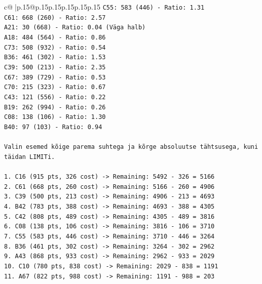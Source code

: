 \documentclass{article}
\begin{document}
{\begin{supertabular}{c@{$\;$}|p{.15\linewidth}@{}p{.15\linewidth}p{.15\linewidth}p{.15\linewidth}p{.15\linewidth}p{.15\linewidth}}
{{{\texttt{C55: 583 (446) {-} Ratio: 1.31} \\
\texttt{C61: 668 (260) {-} Ratio: 2.57} \\
\texttt{A21: 30 (668) {-} Ratio: 0.04 (Väga halb)} \\
\texttt{A18: 484 (564) {-} Ratio: 0.86} \\
\texttt{C73: 508 (932) {-} Ratio: 0.54} \\
\texttt{B36: 461 (302) {-} Ratio: 1.53} \\
\texttt{C39: 500 (213) {-} Ratio: 2.35} \\
\texttt{C67: 389 (729) {-} Ratio: 0.53} \\
\texttt{C70: 215 (323) {-} Ratio: 0.67} \\
\texttt{C43: 121 (556) {-} Ratio: 0.22} \\
\texttt{B19: 262 (994) {-} Ratio: 0.26} \\
\texttt{C08: 138 (106) {-} Ratio: 1.30} \\
\texttt{B40: 97 (103) {-} Ratio: 0.94} \\
\\ 
\texttt{Valin esemed kõige parema suhtega ja kõrge absoluutse tähtsusega, kuni täidan LIMITi.} \\
\\ 
\texttt{1. C16 (915 pts, 326 cost) {-}> Remaining: 5492 {-} 326 = 5166} \\
\texttt{2. C61 (668 pts, 260 cost) {-}> Remaining: 5166 {-} 260 = 4906} \\
\texttt{3. C39 (500 pts, 213 cost) {-}> Remaining: 4906 {-} 213 = 4693} \\
\texttt{4. B42 (783 pts, 388 cost) {-}> Remaining: 4693 {-} 388 = 4305} \\
\texttt{5. C42 (808 pts, 489 cost) {-}> Remaining: 4305 {-} 489 = 3816} \\
\texttt{6. C08 (138 pts, 106 cost) {-}> Remaining: 3816 {-} 106 = 3710} \\
\texttt{7. C55 (583 pts, 446 cost) {-}> Remaining: 3710 {-} 446 = 3264} \\
\texttt{8. B36 (461 pts, 302 cost) {-}> Remaining: 3264 {-} 302 = 2962} \\
\texttt{9. A43 (868 pts, 933 cost) {-}> Remaining: 2962 {-} 933 = 2029} \\
\texttt{10. C10 (780 pts, 838 cost) {-}> Remaining: 2029 {-} 838 = 1191} \\
\texttt{11. A67 (822 pts, 988 cost) {-}> Remaining: 1191 {-} 988 = 203} \\
\\ 
}}}
\end{supertabular}}
\end{document}
